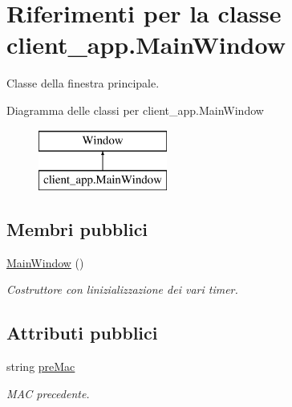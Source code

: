 \hypertarget{classclient__app_1_1_main_window}{}\section{Riferimenti per la classe client\+\_\+app.\+Main\+Window}
\label{classclient__app_1_1_main_window}


Classe della finestra principale.  


Diagramma delle classi per client\+\_\+app.\+Main\+Window\begin{figure}[H]
\begin{center}
\leavevmode
\includegraphics[height=2.000000cm]{classclient__app_1_1_main_window}
\end{center}
\end{figure}
\subsection*{Membri pubblici}
\begin{DoxyCompactItemize}
\item 
\mbox{\label{classclient__app_1_1_main_window_a72146235a48ccf44248dcf856c23ec4f}} 
\mbox{\hyperlink{classclient__app_1_1_main_window_a72146235a48ccf44248dcf856c23ec4f}{Main\+Window}} ()
\begin{DoxyCompactList}\small\item\em Costruttore con l\textquotesingle{}inizializzazione dei vari timer. \end{DoxyCompactList}\end{DoxyCompactItemize}
\subsection*{Attributi pubblici}
\begin{DoxyCompactItemize}
\item 
\mbox{\label{classclient__app_1_1_main_window_ad82e43e2a75e19266cc6c5955b56ddd7}} 
string \mbox{\hyperlink{classclient__app_1_1_main_window_ad82e43e2a75e19266cc6c5955b56ddd7}{pre\+Mac}}
\begin{DoxyCompactList}\small\item\em M\+AC precedente. \end{DoxyCompactList}\end{DoxyCompactItemize}
